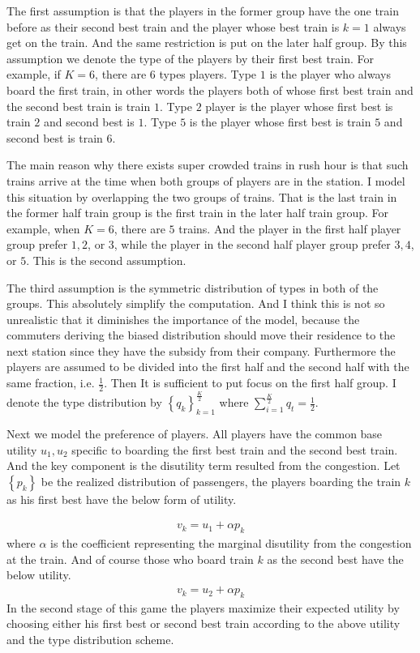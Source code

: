 \documentclass{article}
\begin{document}
The first assumption is that the players in the former group have the one train before as their second best train and the player whose best train is $k = 1$ always get on the train. And the same restriction is put on the later half group. By this assumption we denote the type of the players by their first best train. For example, if $K = 6$, there are $6$ types players. Type $1$ is the player who always board the first train, in other words the players both of whose first best train and the second best train is train $1$. Type $2$ player is the player whose first best is train $2$ and second best is $1$. Type $5$ is the player whose first best is train $5$ and second best is train $6$.

The main reason why there exists super crowded trains in rush hour is that such trains arrive at the time when both groups of players are in the station. I model this situation by overlapping the two groups of trains. That is the last train in the former half train group is the first train in the later half train group. For example, when $K = 6$, there are $5$ trains. And the player in the first half player group prefer $1,2$, or $3$, while the player in the second half player group prefer $3,4$, or $5$. This is the second assumption.

The third assumption is the symmetric distribution of types in both of the groups. This absolutely simplify the computation. And I think this is not so unrealistic that it diminishes the importance of the model, because the commuters deriving the biased distribution should move their residence to the next station since they have the subsidy from their company. Furthermore the players are assumed to be divided into the first half and the second half with the same fraction, i.e. $\frac{1}{2}$. Then It is sufficient to put focus on the first half group. I denote the type distribution by $\left\{ q_k \right\}_{k = 1}^{\frac{K}{2}}$ where $\sum_{i = 1}^{\frac{K}{2}} q_t = \frac{1}{2}$.

Next we model the preference of players. All players have the common base utility $u_1, u_2$ specific to boarding the first best train and the second best train. And the key component is the disutility term resulted from the congestion. Let $\left\{ p_k \right\}$ be the realized distribution of passengers, the players boarding the train $k$ as his first best have the below form of utility.

\begin{align*}
	v_k = u_1 + \alpha p_k
\end{align*}
where $\alpha$ is the coefficient representing the marginal disutility from the congestion at the train. And of course those who board train $k$ as the second best have the below utility.
\begin{align*}
	v_k = u_2 + \alpha p_k
\end{align*} 
In the second stage of this game the players maximize their expected utility by choosing either his first best or second best train according to the above utility and the type distribution scheme. 
\end{document}
